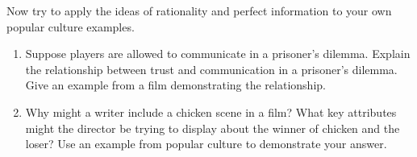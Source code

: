 Now try to apply the ideas of rationality and perfect information to your own popular culture examples.

\begin{enumerate}


\item Suppose players are allowed to communicate in a prisoner's dilemma. Explain the relationship between trust and communication in a prisoner's dilemma. Give an example from a film demonstrating the relationship.

\item Why might a writer include a chicken scene in a film? What key attributes might the director be trying to display about the winner of chicken and the loser? Use an example from popular culture to demonstrate your answer.



\end{enumerate}




 